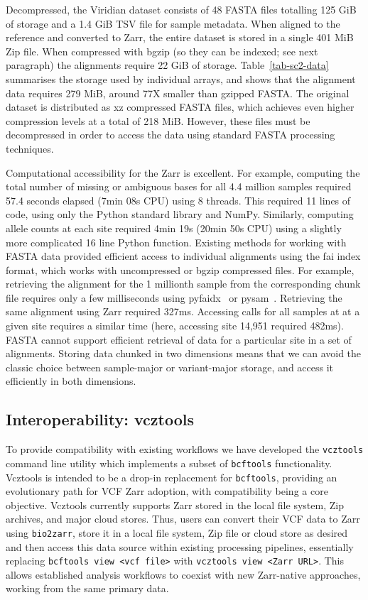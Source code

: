 \documentclass[a4paper,num-refs]{oup-contemporary}
\begin{document}
Decompressed, the Viridian dataset consists of 48
FASTA files totalling 125 GiB of storage and a 1.4 GiB
TSV file for sample metadata.
When aligned to the reference and converted to Zarr, the
entire dataset is stored in a single 401 MiB Zip file.
When compressed with bgzip (so they can be indexed; see next 
paragraph) the alignments require 22 GiB of storage.
Table~\ref{tab-sc2-data} summarises the storage used by individual
arrays, and shows that the alignment data requires 279 MiB,
around 77X smaller than gzipped FASTA.
The original dataset is distributed as xz compressed FASTA files, which
achieves even higher compression levels at a total of 218 MiB.
However, these files must be decompressed in order to access the data
using standard FASTA processing techniques.

Computational accessibility for the Zarr is excellent. For example,
computing the total number of missing or ambiguous bases for 
all 4.4 million samples required 57.4 seconds elapsed (7min 08s CPU)
using 8 threads. This required 11 lines of code, using only the 
Python standard library and NumPy. Similarly, computing allele
counts at each site required 4min 19s (20min 50s CPU) using a slightly
more complicated 16 line Python function.
Existing methods for working with FASTA data provided efficient 
access to individual alignments using the fai index format, which
works with uncompressed or bgzip compressed files.
For example, retrieving the alignment for the 1 millionth sample 
from the corresponding chunk file requires only a few milliseconds
using pyfaidx~\citep{shirley2015efficient} or 
pysam~\citep{pysam}. 
Retrieving the same alignment using Zarr 
required 327ms. 
Accessing calls for all samples at at a given 
site requires a similar time (here, accessing site 14,951
required 482ms). 
FASTA cannot support efficient retrieval
of data for a particular site in a set of alignments.
Storing data chunked in two dimensions means that we can avoid
the classic choice between sample-major or variant-major storage,
and access it efficiently in both dimensions.

\subsection{Interoperability: vcztools}
To provide compatibility with existing workflows we have
developed the \texttt{vcztools} command line utility which
implements a subset of \texttt{bcftools} functionality.
Vcztools is intended to be a drop-in replacement for \texttt{bcftools},
providing an evolutionary path for VCF Zarr adoption,
with compatibility being a core objective.
Vcztools currently supports Zarr stored in the local file system,
Zip archives, and major cloud stores.
Thus, users can convert their VCF data to Zarr using \texttt{bio2zarr},
store it in a local file system, Zip file or cloud store as desired
and then access this data source within existing processing pipelines,
essentially replacing \texttt{bcftools view <vcf file>} with
\texttt{vcztools view <Zarr URL>}.
This allows established analysis workflows to coexist with new Zarr-native
approaches, working from the same primary data.
\end{document}
